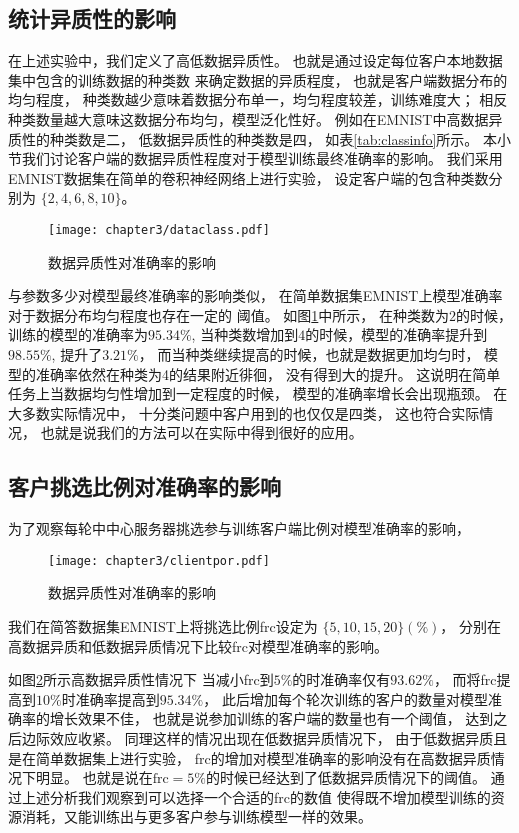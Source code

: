 \subsection{统计异质性的影响}
在上述实验中，我们定义了高低数据异质性。
也就是通过设定每位客户本地数据集中包含的训练数据的种类数
来确定数据的异质程度，
也就是客户端数据分布的均匀程度，
种类数越少意味着数据分布单一，均匀程度较差，训练难度大；
相反种类数量越大意味这数据分布均匀，模型泛化性好。
例如在EMNIST中高数据异质性的种类数是二，
低数据异质性的种类数是四，
如表\ref{tab:classinfo}所示。
本小节我们讨论客户端的数据异质性程度对于模型训练最终准确率的影响。
我们采用EMNIST数据集在简单的卷积神经网络上进行实验，
设定客户端的包含种类数分别为
$\{2, 4, 6, 8, 10 \}$。
\begin{figure}[thbp]
    \centering
    \texttt{[image: chapter3/dataclass.pdf]}
    \caption{\label{fig:3-4-dataclass}数据异质性对准确率的影响}
\end{figure}

与参数多少对模型最终准确率的影响类似，
在简单数据集EMNIST上模型准确率对于数据分布均匀程度也存在一定的
阈值。
如图\ref{fig:3-4-dataclass}中所示，
在种类数为$2$的时候，训练的模型的准确率为$95.34\%$,
当种类数增加到$4$的时候，模型的准确率提升到$98.55\%$,
提升了$3.21\%$，
而当种类继续提高的时候，也就是数据更加均匀时，
模型的准确率依然在种类为4的结果附近徘徊，
没有得到大的提升。
这说明在简单任务上当数据均匀性增加到一定程度的时候，
模型的准确率增长会出现瓶颈。
在大多数实际情况中，
十分类问题中客户用到的也仅仅是四类，
这也符合实际情况，
也就是说我们的方法可以在实际中得到很好的应用。

\subsection{客户挑选比例对准确率的影响}
为了观察每轮中中心服务器挑选参与训练客户端比例对模型准确率的影响，
\begin{figure}[thbp]
    \centering
    \texttt{[image: chapter3/clientpor.pdf]}
    \caption{\label{fig:3-4-clientpor}数据异质性对准确率的影响}
\end{figure}
我们在简答数据集EMNIST上将挑选比例frc设定为
$\{5, 10, 15, 20 \}(\%)$，
分别在高数据异质和低数据异质情况下比较frc对模型准确率的影响。

如图\ref{fig:3-4-clientpor}所示高数据异质性情况下
当减小frc到$5\%$的时准确率仅有$93.62\%$，
而将frc提高到$10\%$时准确率提高到$95.34\%$，
此后增加每个轮次训练的客户的数量对模型准确率的增长效果不佳，
也就是说参加训练的客户端的数量也有一个阈值，
达到之后边际效应收紧。
同理这样的情况出现在低数据异质情况下，
由于低数据异质且是在简单数据集上进行实验，
frc的增加对模型准确率的影响没有在高数据异质情况下明显。
也就是说在$\text{frc}=5\%$的时候已经达到了低数据异质情况下的阈值。
通过上述分析我们观察到可以选择一个合适的frc的数值
使得既不增加模型训练的资源消耗，又能训练出与更多客户参与训练模型一样的效果。

